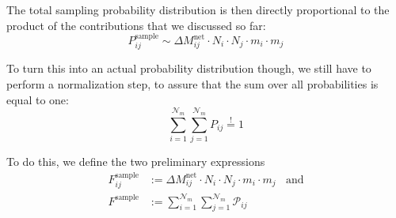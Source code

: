 

    

    The total sampling probability distribution is then directly proportional to the product of 
    the contributions that we discussed so far:
    \begin{equation}
        P_{ij}^\text{sample} \sim \Delta M_{ij}^\text{net} \cdot N_i \cdot N_j \cdot m_i \cdot m_j
    \end{equation}

    To turn this into an actual probability distribution though, we still have to perform a 
    normalization step, to assure that the sum over all probabilities is equal to one:
    \begin{equation}
        \sum_{i=1}^{\mathcal N_m}\sum_{j=1}^{\mathcal N_m}P_{ij} \overset{!}{=} 1
    \end{equation}

    To do this, we define the two preliminary expressions 
    \begin{align}
        F_{ij}^\text{sample} 
            &:= \Delta M_{ij}^\text{net} \cdot N_i \cdot N_j \cdot m_i \cdot m_j 
        \ \ \ \ \text{and} \\
        F^\text{sample} 
            &:= \sum_{i=1}^{\mathcal N_m} \sum_{j=1}^{\mathcal N_m} \mathcal P_{ij}
    \end{align}


